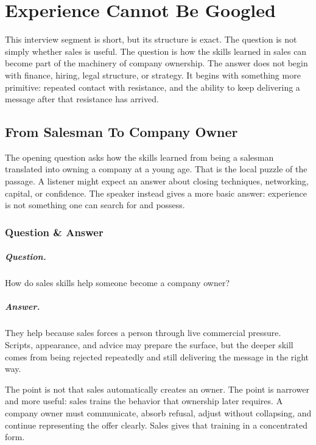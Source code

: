 \chapter{Experience Cannot Be Googled}

This interview segment is short, but its structure is exact. The question is not simply whether sales is useful. The question is how the skills learned in sales can become part of the machinery of company ownership. The answer does not begin with finance, hiring, legal structure, or strategy. It begins with something more primitive: repeated contact with resistance, and the ability to keep delivering a message after that resistance has arrived.

\section{From Salesman To Company Owner}

The opening question asks how the skills learned from being a salesman translated into owning a company at a young age. That is the local puzzle of the passage. A listener might expect an answer about closing techniques, networking, capital, or confidence. The speaker instead gives a more basic answer: experience is not something one can search for and possess.

\subsection{Question \& Answer}

\paragraph{Question.}
How do sales skills help someone become a company owner?

\paragraph{Answer.}
They help because sales forces a person through live commercial pressure. Scripts, appearance, and advice may prepare the surface, but the deeper skill comes from being rejected repeatedly and still delivering the message in the right way.

The point is not that sales automatically creates an owner. The point is narrower and more useful: sales trains the behavior that ownership later requires. A company owner must communicate, absorb refusal, adjust without collapsing, and continue representing the offer clearly. Sales gives that training in a concentrated form.

